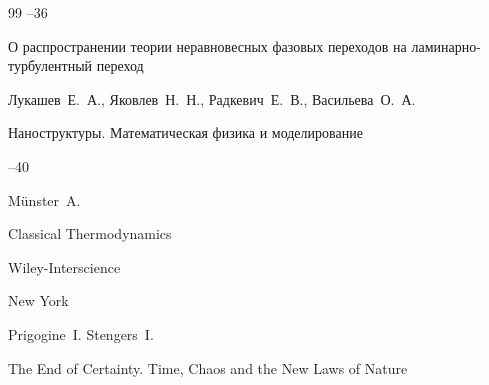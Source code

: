 \begin{thebibliography}{99}
--36

%













\paper О распространении теории неравновесных фазовых переходов на ламинарно-турбулентный переход

\by Лукашев~Е.~А., Яковлев~Н.~Н., Радкевич~Е.~В., Васильева~О.~А.

\jour Наноструктуры. Математическая физика и моделирование




--40












\by M\"unster~A.

\book Classical Thermodynamics


\publ Wiley-Interscience

\publaddr New York






\by Prigogine~I.  Stengers~I.

\book The End of Certainty. Time, Chaos and the New Laws of Nature


\end{thebibliography}
